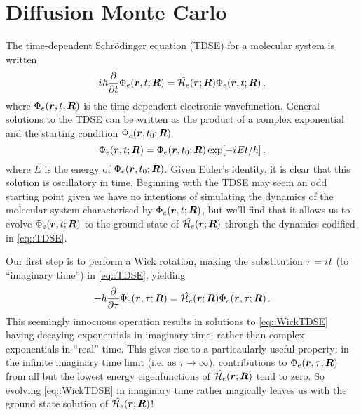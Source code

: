 \section{Diffusion Monte Carlo}
The time-dependent Schr\"{o}dinger equation (TDSE) for a molecular system is written
%
\begin{equation}\label{eq::TDSE}
  {i\mkern1mu}\hbar\frac{\partial}{\partial t}\Phi_e(\boldsymbol{r},t;\boldsymbol{R}) = \hat{\mathcal{H}_e}(\boldsymbol{r};\boldsymbol{R})\Phi_e(\boldsymbol{r},t;\boldsymbol{R}) \,,
\end{equation}
%
where $\Phi_e(\boldsymbol{r},t;\boldsymbol{R})$ is the time-dependent electronic wavefunction. General solutions
to the TDSE can be written as the product of a complex exponential and the starting
condition $\Phi_e(\boldsymbol{r},t_0;\boldsymbol{R})$
%
\begin{equation}
  \Phi_e(\boldsymbol{r},t;\boldsymbol{R}) = \Phi_e(\boldsymbol{r},t_0;\boldsymbol{R})\exp[-{i\mkern1mu} E t / \hbar] \,,
\end{equation}
%
where $E$ is the energy of $\Phi_e(\boldsymbol{r},t_0;\boldsymbol{R})$. Given Euler's identity, it is clear that
this solution is oscillatory in time. Beginning with the TDSE may seem
an odd starting point given we have no intentions of simulating the dynamics of
the molecular system characterised by $\Phi_e(\boldsymbol{r},t;\boldsymbol{R})$, but we'll find that it allows
us to evolve $\Phi_e(\boldsymbol{r},t;\boldsymbol{R})$ to the ground state of $\hat{\mathcal{H}_e}(\boldsymbol{r};\boldsymbol{R})$ through the
dynamics codified in \eqref{eq::TDSE}.

Our first step is to perform a Wick rotation, making the substitution $\tau = {i\mkern1mu} t$
(to ``imaginary time'') in \eqref{eq::TDSE}, yielding
%
\begin{equation}\label{eq::WickTDSE}
  -\hbar\frac{\partial}{\partial \tau}\Phi_e(\boldsymbol{r},\tau;\boldsymbol{R}) = \hat{\mathcal{H}_e}(\boldsymbol{r};\boldsymbol{R})\Phi_e(\boldsymbol{r},\tau;\boldsymbol{R}) \,.
\end{equation}
%
This seemingly innocuous operation results in solutions to \eqref{eq::WickTDSE} having
decaying exponentials in imaginary time, rather than complex exponentials in ``real''
time. This gives rise to a particaularly useful property: in the infinite imaginary
time limit (i.e. as $\tau \rightarrow \infty$), contributions to $\Phi_e(\boldsymbol{r},\tau;\boldsymbol{R})$
from all but the lowest energy eigenfunctions of $\hat{\mathcal{H}_e}(\boldsymbol{r};\boldsymbol{R})$ tend to zero. So evolving
\eqref{eq::WickTDSE} in imaginary time rather magically leaves us with the ground state
solution of $\hat{\mathcal{H}_e}(\boldsymbol{r};\boldsymbol{R})$!
